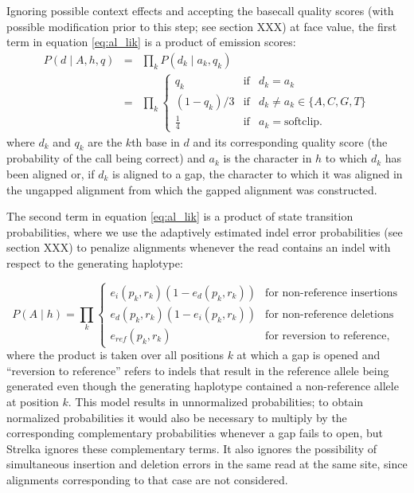\documentclass{article}
\begin{document}
Ignoring possible context effects and accepting the basecall quality scores (with possible modification prior to this step; see section XXX) at face value, the first term in equation \ref{eq:al_lik} is a product of emission scores:
\begin{eqnarray}
P(d \mid A,h,q) & = & \prod_k P(d_k \mid a_k,q_k)\\
& = & \prod_k \left\{
                        \begin{array}{lcl}
                             q_k & \mathrm{if} & d_k=a_k\\
                             (1-q_k)/3 & \mathrm{if} &  d_k \neq a_k \in \{A,C,G,T\}\\
                             \frac{1}{4} & \mathrm{if} & a_k=\mathrm{softclip}.
                        \end{array}
                      \right.
\end{eqnarray}
where $d_k$ and $q_k$ are the $k$th base in $d$ and its corresponding quality score (the probability of the call being correct) and $a_k$ is the character in $h$ to which $d_k$ has been aligned or, if $d_k$ is aligned to a gap, the character to which it was aligned in the ungapped alignment from which the gapped alignment was constructed.

The second term in equation \ref{eq:al_lik} is a product of state transition probabilities, where we use the adaptively estimated indel error probabilities (see section XXX) to penalize alignments whenever the read contains an indel with respect to the generating haplotype:

\begin{equation}
\label{eq:transition_probs}
P(A \mid h) = \prod_k \left\{
\begin{array}{ll}
e_i(p_k,r_k)(1-e_d(p_k,r_k)) & \textrm{for~non-reference~insertions}\\
e_d(p_k,r_k)(1-e_i(p_k,r_k)) & \textrm{for~non-reference~deletions}\\
e_{ref}(p_k,r_k) & \textrm{for~reversion~to~reference},
\end{array}
\right.
\end{equation}
where the product is taken over all positions $k$ at which a gap is opened and ``reversion to reference'' refers to indels that result in the reference allele being generated even though the generating haplotype contained a non-reference allele at position $k$. This model results in unnormalized probabilities; to obtain normalized probabilities it would also be necessary to multiply by the corresponding complementary probabilities whenever a gap fails to open, but Strelka ignores these complementary terms. It also ignores the possibility of simultaneous insertion and deletion errors in the same read at the same site, since alignments corresponding to that case are not considered.
\end{document}
